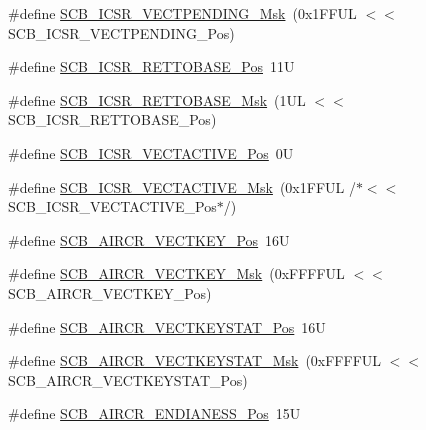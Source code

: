 \begin{DoxyCompactItemize}
\item 
\#define \mbox{\hyperlink{group___c_m_s_i_s___s_c_b_gacb6992e7c7ddc27a370f62878a21ef72}{S\+C\+B\+\_\+\+I\+C\+S\+R\+\_\+\+V\+E\+C\+T\+P\+E\+N\+D\+I\+N\+G\+\_\+\+Msk}}~(0x1\+F\+F\+U\+L $<$$<$ S\+C\+B\+\_\+\+I\+C\+S\+R\+\_\+\+V\+E\+C\+T\+P\+E\+N\+D\+I\+N\+G\+\_\+\+Pos)
\item 
\#define \mbox{\hyperlink{group___c_m_s_i_s___s_c_b_ga403d154200242629e6d2764bfc12a7ec}{S\+C\+B\+\_\+\+I\+C\+S\+R\+\_\+\+R\+E\+T\+T\+O\+B\+A\+S\+E\+\_\+\+Pos}}~11U
\item 
\#define \mbox{\hyperlink{group___c_m_s_i_s___s_c_b_gaca6fc3f79bb550f64fd7df782ed4a5f6}{S\+C\+B\+\_\+\+I\+C\+S\+R\+\_\+\+R\+E\+T\+T\+O\+B\+A\+S\+E\+\_\+\+Msk}}~(1\+U\+L $<$$<$ S\+C\+B\+\_\+\+I\+C\+S\+R\+\_\+\+R\+E\+T\+T\+O\+B\+A\+S\+E\+\_\+\+Pos)
\item 
\#define \mbox{\hyperlink{group___c_m_s_i_s___s_c_b_gae4f602c7c5c895d5fb687b71b0979fc3}{S\+C\+B\+\_\+\+I\+C\+S\+R\+\_\+\+V\+E\+C\+T\+A\+C\+T\+I\+V\+E\+\_\+\+Pos}}~0U
\item 
\#define \mbox{\hyperlink{group___c_m_s_i_s___s_c_b_ga5533791a4ecf1b9301c883047b3e8396}{S\+C\+B\+\_\+\+I\+C\+S\+R\+\_\+\+V\+E\+C\+T\+A\+C\+T\+I\+V\+E\+\_\+\+Msk}}~(0x1\+F\+F\+U\+L /$\ast$$<$$<$ S\+C\+B\+\_\+\+I\+C\+S\+R\+\_\+\+V\+E\+C\+T\+A\+C\+T\+I\+V\+E\+\_\+\+Pos$\ast$/)
\item 
\#define \mbox{\hyperlink{group___c_m_s_i_s___s_c_b_gaaa27c0ba600bf82c3da08c748845b640}{S\+C\+B\+\_\+\+A\+I\+R\+C\+R\+\_\+\+V\+E\+C\+T\+K\+E\+Y\+\_\+\+Pos}}~16U
\item 
\#define \mbox{\hyperlink{group___c_m_s_i_s___s_c_b_ga90c7cf0c490e7ae55f9503a7fda1dd22}{S\+C\+B\+\_\+\+A\+I\+R\+C\+R\+\_\+\+V\+E\+C\+T\+K\+E\+Y\+\_\+\+Msk}}~(0x\+F\+F\+F\+F\+U\+L $<$$<$ S\+C\+B\+\_\+\+A\+I\+R\+C\+R\+\_\+\+V\+E\+C\+T\+K\+E\+Y\+\_\+\+Pos)
\item 
\#define \mbox{\hyperlink{group___c_m_s_i_s___s_c_b_gaec404750ff5ca07f499a3c06b62051ef}{S\+C\+B\+\_\+\+A\+I\+R\+C\+R\+\_\+\+V\+E\+C\+T\+K\+E\+Y\+S\+T\+A\+T\+\_\+\+Pos}}~16U
\item 
\#define \mbox{\hyperlink{group___c_m_s_i_s___s_c_b_gabacedaefeefc73d666bbe59ece904493}{S\+C\+B\+\_\+\+A\+I\+R\+C\+R\+\_\+\+V\+E\+C\+T\+K\+E\+Y\+S\+T\+A\+T\+\_\+\+Msk}}~(0x\+F\+F\+F\+F\+U\+L $<$$<$ S\+C\+B\+\_\+\+A\+I\+R\+C\+R\+\_\+\+V\+E\+C\+T\+K\+E\+Y\+S\+T\+A\+T\+\_\+\+Pos)
\item 
\#define \mbox{\hyperlink{group___c_m_s_i_s___s_c_b_gad31dec98fbc0d33ace63cb1f1a927923}{S\+C\+B\+\_\+\+A\+I\+R\+C\+R\+\_\+\+E\+N\+D\+I\+A\+N\+E\+S\+S\+\_\+\+Pos}}~15U

\end{DoxyCompactItemize}
